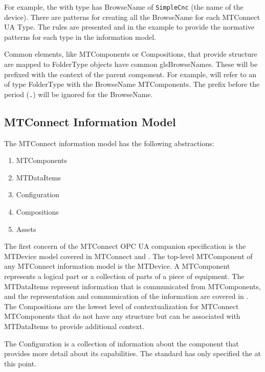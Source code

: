 For example, the with type  has \gls{BrowseName} of \texttt{SimpleCnc} (the name of the device). There are patterns for creating all the \gls{BrowseName} for each MTConnect UA Type. The rules are presented and in the example to provide the normative patterns for each type in the information model.

Common elements, like \glspl{MTComponent} or \glspl{Composition}, that provide structure are mapped to \gls{FolderType} objects have common gls{BrowseNames}. These will be prefixed with the context of the parent component. For example,  will refer to an  of type \gls{FolderType} with the \gls{BrowseName} \glspl{MTComponent}. The prefix before the period (\texttt{.}) will be ignored for the \gls{BrowseName}. 

\FloatBarrier

\subsection{MTConnect Information Model}

The MTConnect information model has the following abstractions:

\begin{enumerate}
  \item \glspl{MTComponent}
  \item \glspl{MTDataItem}
  \item \gls{Configuration}
  \item \glspl{Composition}
  \item \glspl{Asset}
\end{enumerate}

The first concern of the MTConnect OPC UA companion specification is the \gls{MTDevice} model covered in MTConnect \cite{MTCPart2} and \cite{MTCPart3}. The top-level \gls{MTComponent} of any MTConnect information model is the \gls{MTDevice}. A \gls{MTComponent} represents a logical part or a collection of parts of a piece of equipment. The \glspl{MTDataItem} represent information that is communicated from \glspl{MTComponent}, and the representation and communication of the information are covered in \cite{MTCPart3}. The \glspl{Composition} are the lowest level of contextualization for MTConnect \glspl{MTComponent} that do not have any structure but can be associated with \glspl{MTDataItem} to provide additional context. 

The \gls{Configuration} is a collection of information about the component that provides more detail about its capabilities. The standard has only specified the  at this point.

